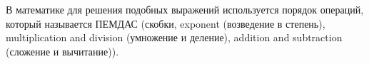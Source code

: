 \documentclass[preview]{standalone}
\begin{document}
\begin{center}
В математике для решения подобных выражений используется порядок операций, который называется ПЕМДАС (скобки, exponent (возведение в степень), multiplication and division (умножение и деление), addition and subtraction (сложение и вычитание)).
\end{center}
\end{document}
